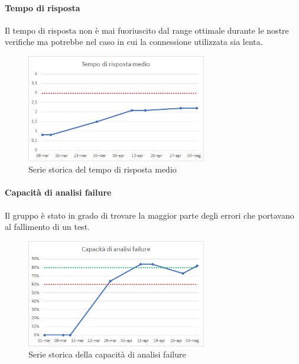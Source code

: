     \paragraph{Tempo di risposta} \Spazio
    Il tempo di risposta non è mai fuoriuscito dal range ottimale durante le nostre verifiche ma potrebbe nel caso in cui la connessione utilizzata sia lenta.
    \begin{figure}[H]
    	\centering 
    	\includegraphics[width=0.7\textwidth]{Images/risposta.png}
    	\caption{Serie storica del tempo di risposta medio}
    	\label{risposta} 
    \end{figure}
    \paragraph{Capacità di analisi failure} \Spazio
    Il gruppo è stato in grado di trovare la maggior parte degli errori che portavano al fallimento di un test.
    \begin{figure}[H]
    	\centering 
    	\includegraphics[width=0.7\textwidth]{Images/cap.png}
    	\caption{Serie storica della capacità di analisi failure}
    	\label{cap} 
    \end{figure}
